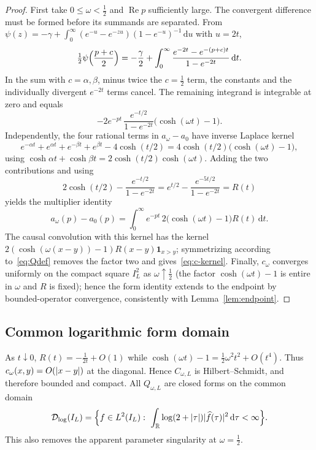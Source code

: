 \documentclass[11pt,a4paper]{article}
\newcommand{\R}{\mathbb R}
\newcommand{\Dlog}{\mathcal D_{\log}}
\renewcommand{\Re}{\operatorname{Re}}
\newcommand{\dd}{\,\mathrm d}
\DeclarePairedDelimiter{\abs}{\lvert}{\rvert}
\theoremstyle{plain}
\theoremstyle{definition}
\numberwithin{equation}{section}
\begin{document}
\begin{proof}
First take $0\le\omega<\tfrac12$ and $\Re p$ sufficiently large. The
convergent difference must be formed before its summands are separated. From
$\psi(z)=-\gamma+\int_0^\infty(e^{-u}-e^{-zu})(1-e^{-u})^{-1}\dd u$ with
$u=2t$,
\begin{equation}
\tfrac12\psi\Bigl(\frac{p+c}2\Bigr)=-\frac\gamma2+\int_0^\infty
\frac{e^{-2t}-e^{-(p+c)t}}{1-e^{-2t}}\dd t .
\end{equation}
In the sum with $c=\alpha,\beta$, minus twice the $c=\tfrac12$ term, the
constants and the individually divergent $e^{-2t}$ terms cancel. The remaining
integrand is integrable at zero and equals
\begin{equation}
-2e^{-pt}\,\frac{e^{-t/2}}{1-e^{-2t}}\bigl(\cosh(\omega t)-1\bigr).
\end{equation}
Independently, the four rational terms in $a_\omega-a_0$ have inverse Laplace
kernel
\begin{equation}
e^{-\alpha t}+e^{\alpha t}+e^{-\beta t}+e^{\beta t}-4\cosh(t/2)
=4\cosh(t/2)\bigl(\cosh(\omega t)-1\bigr),
\end{equation}
using $\cosh\alpha t+\cosh\beta t=2\cosh(t/2)\cosh(\omega t)$. Adding the two
contributions and using
\begin{equation}
2\cosh(t/2)-\frac{e^{-t/2}}{1-e^{-2t}}
=e^{t/2}-\frac{e^{-5t/2}}{1-e^{-2t}}=R(t)
\end{equation}
yields the multiplier identity
\begin{equation}\label{eq:multiplier-identity}
a_\omega(p)-a_0(p)=\int_0^\infty e^{-pt}\,2\bigl(\cosh(\omega t)-1\bigr)R(t)\dd t .
\end{equation}
The causal convolution with this kernel has the kernel
$2(\cosh(\omega(x-y))-1)R(x-y)\mathbf 1_{x>y}$; symmetrizing according
to~\eqref{eq:Qdef} removes the factor two and gives~\eqref{eq:c-kernel}.
Finally, $c_\omega$ converges uniformly on the compact square $I_L^2$ as
$\omega\uparrow\tfrac12$ (the factor $\cosh(\omega t)-1$ is entire in
$\omega$ and $R$ is fixed); hence the form identity extends to the endpoint
by bounded-operator convergence, consistently with Lemma~\ref{lem:endpoint}.
\end{proof}

\subsection{Common logarithmic form domain}

As $t\downarrow0$, $R(t)=-\tfrac1{2t}+O(1)$ while
$\cosh(\omega t)-1=\tfrac12\omega^2t^2+O(t^4)$. Thus $c_\omega(x,y)=O(\abs{x-y})$
at the diagonal. Hence $C_{\omega,L}$ is Hilbert--Schmidt, and therefore
bounded and compact. All $Q_{\omega,L}$ are closed forms on the common domain
\begin{equation}\label{eq:Dlog}
\Dlog(I_L)=\Bigl\{f\in L^2(I_L):\ \int_\R\log(2+\abs\tau)\abs{\widehat f(\tau)}^2\dd\tau<\infty\Bigr\}.
\end{equation}
This also removes the apparent parameter singularity at $\omega=\tfrac12$.
\end{document}
